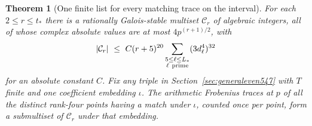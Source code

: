 \documentclass[a4paper,11pt]{article}
\newtheorem{theorem}[proposition]{Theorem}
\theoremstyle{definition}
\theoremstyle{remark}
\numberwithin{equation}{section}
\begin{document}
\begin{theorem}[One finite list for every matching trace on the interval]
\leavevmode\label{thm:commoncusplist561}
For each \(2\le r\le t_*\) there is a rationally Galois-stable
multiset \(\mathcal C_r\) of algebraic integers, all of whose
complex absolute values are at most \(4p^{(r+1)/2}\), with
\[
    |\mathcal C_r|\ \le\
        C(r+5)^{20}\sum_{\substack{5\le\ell\le L_*\\\ell\ {\rm prime}}}
                                      (3d_\ell^4)^{32}
\]
for an absolute constant \(C\). Fix any triple in
Section~\ref{sec:generaleven547} with \(T\) finite and one
coefficient embedding \(\iota\). The arithmetic Frobenius traces
at \(p\) of all the distinct rank-four points having a match
under \(\iota\), counted once per point, form a submultiset of
\(\mathcal C_r\) under that embedding.
\end{theorem}
\end{document}
